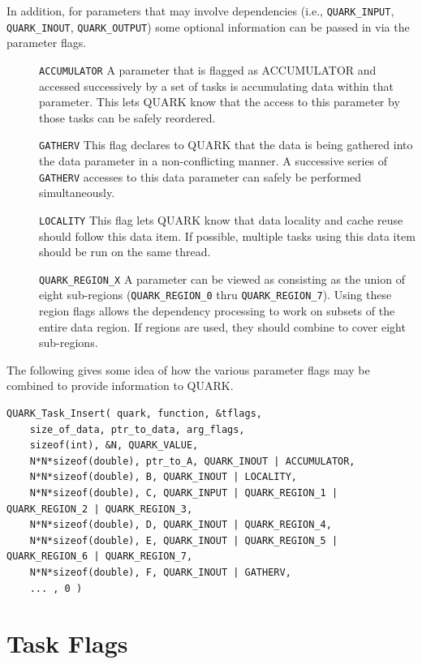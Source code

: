 \documentclass[11pt,letterpaper]{report}
\begin{document}
In addition, for parameters that may involve dependencies (i.e.,
\verb|QUARK_INPUT|, \verb|QUARK_INOUT|, \verb|QUARK_OUTPUT|) some optional information
can be passed in via the parameter flags.
\begin{description}
\item[]\verb|ACCUMULATOR| A parameter that is flagged as ACCUMULATOR
  and accessed successively by a set of tasks is accumulating data
  within that parameter.  This lets QUARK know that the access to this
  parameter by those tasks can be safely reordered.
\item[]\verb|GATHERV| This flag declares to QUARK that the data is
  being gathered into the data parameter in a non-conflicting manner.
  A successive series of \verb|GATHERV| accesses to this data parameter
  can safely be performed simultaneously.
\item[]\verb|LOCALITY|  This flag lets QUARK know that data locality
  and cache reuse should follow this data item.  If possible, multiple
  tasks using this data item should be run on the same thread.
\item[]\verb|QUARK_REGION_X| A parameter can be viewed as consisting
  as the union of eight sub-regions (\verb|QUARK_REGION_0| thru
  \verb|QUARK_REGION_7|).  Using these region flags allows the
  dependency processing to work on subsets of the entire data region.
  If regions are used, they should combine to cover eight sub-regions.
\end{description}
\pagebreak[3]
The following gives some idea of how the various parameter flags may
be combined to provide information to QUARK.
\pagebreak[3]
\begin{samepage}
\begin{lstlisting}
QUARK_Task_Insert( quark, function, &tflags,
    size_of_data, ptr_to_data, arg_flags,
    sizeof(int), &N, QUARK_VALUE,
    N*N*sizeof(double), ptr_to_A, QUARK_INOUT | ACCUMULATOR,
    N*N*sizeof(double), B, QUARK_INOUT | LOCALITY,
    N*N*sizeof(double), C, QUARK_INPUT | QUARK_REGION_1 | QUARK_REGION_2 | QUARK_REGION_3,
    N*N*sizeof(double), D, QUARK_INOUT | QUARK_REGION_4,
    N*N*sizeof(double), E, QUARK_INOUT | QUARK_REGION_5 | QUARK_REGION_6 | QUARK_REGION_7,
    N*N*sizeof(double), F, QUARK_INOUT | GATHERV,
    ... , 0 )
\end{lstlisting}
\end{samepage}
\pagebreak[3]

\section{Task Flags}
\end{document}
